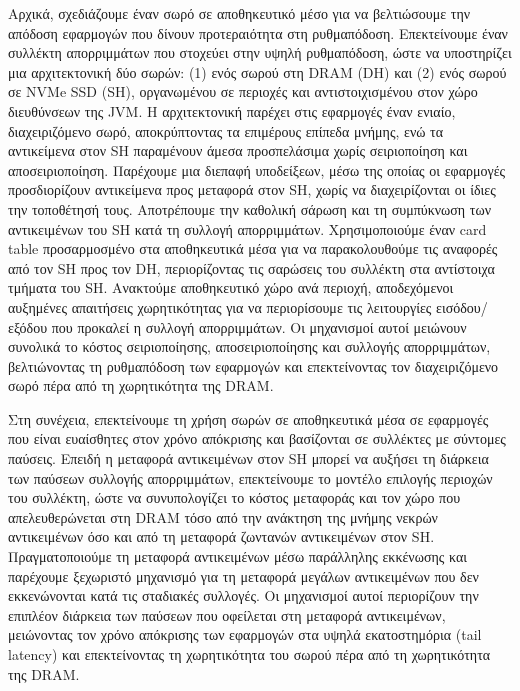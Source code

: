 {  Αρχικά, σχεδιάζουμε έναν σωρό σε αποθηκευτικό μέσο για να βελτιώσουμε την απόδοση εφαρμογών που δίνουν προτεραιότητα στη ρυθμαπόδοση.
  Επεκτείνουμε έναν συλλέκτη απορριμμάτων που στοχεύει στην υψηλή ρυθμαπόδοση, ώστε να υποστηρίζει μια αρχιτεκτονική δύο σωρών: (1) ενός σωρού στη \selam DRAM\selg{} (\selam DH\selg) και (2) ενός σωρού σε \selam NVMe SSD\selg{} (\selam SH\selg), οργανωμένου σε περιοχές και αντιστοιχισμένου στον χώρο διευθύνσεων της \selam JVM\selg.
  Η αρχιτεκτονική παρέχει στις εφαρμογές έναν ενιαίο, διαχειριζόμενο σωρό, αποκρύπτοντας τα επιμέρους επίπεδα μνήμης, ενώ τα αντικείμενα στον \selam SH\selg{} παραμένουν άμεσα προσπελάσιμα χωρίς σειριοποίηση και αποσειριοποίηση.
  Παρέχουμε μια διεπαφή υποδείξεων, μέσω της οποίας οι εφαρμογές προσδιορίζουν αντικείμενα προς μεταφορά στον \selam SH\selg, χωρίς να διαχειρίζονται οι ίδιες την τοποθέτησή τους.
  Αποτρέπουμε την καθολική σάρωση και τη συμπύκνωση των αντικειμένων του \selam SH\selg{} κατά τη συλλογή απορριμμάτων.
  Χρησιμοποιούμε έναν \selam card table\selg{} προσαρμοσμένο στα αποθηκευτικά μέσα για να παρακολουθούμε τις αναφορές από τον \selam SH\selg{} προς τον \selam DH\selg, περιορίζοντας τις σαρώσεις του συλλέκτη στα αντίστοιχα τμήματα του \selam SH\selg.
  Ανακτούμε αποθηκευτικό χώρο ανά περιοχή, αποδεχόμενοι αυξημένες απαιτήσεις χωρητικότητας για να περιορίσουμε τις λειτουργίες εισόδου/εξόδου που προκαλεί η συλλογή απορριμμάτων.
  Οι μηχανισμοί αυτοί μειώνουν συνολικά το κόστος σειριοποίησης, αποσειριοποίησης και συλλογής απορριμμάτων, βελτιώνοντας τη ρυθμαπόδοση των εφαρμογών και επεκτείνοντας τον διαχειριζόμενο σωρό πέρα από τη χωρητικότητα της \selam DRAM\selg.

  Στη συνέχεια, επεκτείνουμε τη χρήση σωρών σε αποθηκευτικά μέσα σε εφαρμογές που είναι ευαίσθητες στον χρόνο απόκρισης και βασίζονται σε συλλέκτες με σύντομες παύσεις.
  Επειδή η μεταφορά αντικειμένων στον \selam SH\selg{} μπορεί να αυξήσει τη διάρκεια των παύσεων συλλογής απορριμμάτων, επεκτείνουμε το μοντέλο επιλογής περιοχών του συλλέκτη, ώστε να συνυπολογίζει το κόστος μεταφοράς και τον χώρο που απελευθερώνεται στη \selam DRAM\selg{} τόσο από την ανάκτηση της μνήμης νεκρών αντικειμένων όσο και από τη μεταφορά ζωντανών αντικειμένων στον \selam SH\selg.
  Πραγματοποιούμε τη μεταφορά αντικειμένων μέσω παράλληλης εκκένωσης και παρέχουμε ξεχωριστό μηχανισμό για τη μεταφορά μεγάλων αντικειμένων που δεν εκκενώνονται κατά τις σταδιακές συλλογές.
  Οι μηχανισμοί αυτοί περιορίζουν την επιπλέον διάρκεια των παύσεων που οφείλεται στη μεταφορά αντικειμένων, μειώνοντας τον χρόνο απόκρισης των εφαρμογών στα υψηλά εκατοστημόρια (\selam tail latency\selg) και επεκτείνοντας τη χωρητικότητα του σωρού πέρα από τη χωρητικότητα της \selam DRAM\selg.

}

